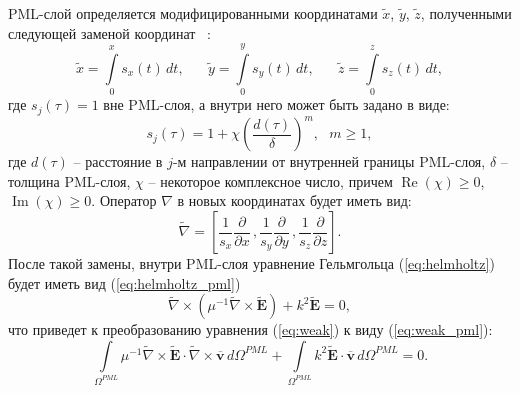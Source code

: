 \documentclass[a4paper,12pt]{article}
\renewcommand{\Re}{\mathop{\mathrm{Re}}\nolimits}
\renewcommand{\Im}{\mathop{\mathrm{Im}}\nolimits}
\begin{document}
PML-слой определяется модифицированными координатами $\tilde{x}$, $\tilde{y}$, $\tilde{z}$, полученными следующей заменой координат ~\citep{wiik_dehoop_ursin}:
\begin{equation*}
	\tilde{x} = \int\limits_0^x s_x (t) \,dt ,
	\text{~~~~~}
	\tilde{y} = \int\limits_0^y s_y (t) \,dt ,
	\text{~~~~~}
	\tilde{z} = \int\limits_0^z s_z (t) \,dt ,
\end{equation*}
где $s_j(\tau) = 1$ вне PML-слоя, а внутри него может быть задано в виде:
\begin{equation}
	s_j(\tau) = 1 + \chi \left( \frac{d(\tau)}{\delta} \right)^m , \text{~~} m \geq 1 ,
	\label{eq:pml_s}
\end{equation}
где $d(\tau)$ -- расстояние в $j$-м направлении от внутренней границы PML-слоя, $\delta$ -- толщина PML-слоя, $\chi$ -- некоторое комплексное число, причем $\Re(\chi) \ge 0$, $\Im(\chi) \ge 0$. Оператор $\nabla$ в новых координатах будет иметь вид:
\begin{equation*}
	\tilde{\nabla} = \left[ \frac{1}{s_x} \frac{\partial}{\partial x} \,, \frac{1}{s_y} \frac{\partial}{\partial y} \,, \frac{1}{s_z} \frac{\partial}{\partial z} \right] .
\end{equation*}
После такой замены, внутри PML-слоя уравнение Гельмгольца (\ref{eq:helmholtz}) будет иметь вид (\ref{eq:helmholtz_pml})
\begin{equation}
	\tilde{\nabla} \times ( \mu^{-1} \tilde{\nabla} \times \tilde{\mathbf{E}} ) + k^{2} \tilde{\mathbf{E}} = 0 , \label{eq:helmholtz_pml}
\end{equation}
что приведет к преобразованию уравнения (\ref{eq:weak}) к виду (\ref{eq:weak_pml}):
\begin{equation}
	\int\limits_{{\Omega^{PML}}} \mu^{-1} \tilde{\nabla} \times \tilde{\mathbf{E}} \cdot \tilde{\nabla} \times \overline{\mathbf{v}} \,d{\Omega^{PML}} + \int\limits_{{\Omega^{PML}}} k^{2} \tilde{\mathbf{E}} \cdot \overline{\mathbf{v}} \,d{\Omega^{PML}} = 0 . \label{eq:weak_pml}
\end{equation}
\end{document}
